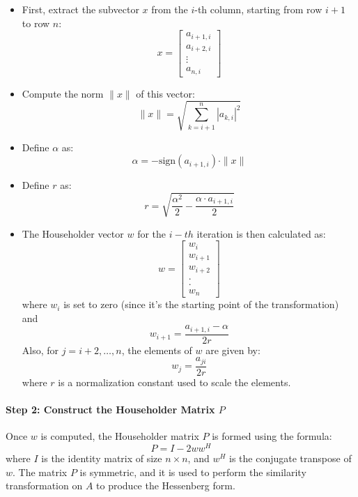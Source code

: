 \documentclass[journal,12pt,onecolumn]{IEEEtran}
\theoremstyle{remark}
\begin{document}
\begin{itemize}
	\item First, extract the subvector \( x \) from the \( i \)-th column, starting from row \( i+1 \) to row \( n \):
	\[
	x = \begin{bmatrix} 
		a_{i+1,i} \\
		a_{i+2,i} \\
		\vdots \\
		a_{n,i}
	\end{bmatrix}
	\]
	\item Compute the norm \( \|x\| \) of this vector:
	\[
	\|x\| = \sqrt{\sum_{k=i+1}^{n} |a_{k,i}|^2}
	\]
	\item Define \(\alpha\) as:
	\[
	\alpha = -\text{sign}(a_{i+1,i}) \cdot \|x\|
	\]
	\item Define \(r \) as:
	\[
	r = \sqrt{\frac{\alpha^{2}}{2} - \frac{\alpha \cdot a_{i+1,i}}{2}}
	\]
	\item The Householder vector \( w \) for the $i-th$ iteration is then calculated as:
	\[
	w = \begin{bmatrix} 
		w_i \\
		w_{i+1} \\
		w_{i+2} \\
		. \\
		. \\
		w_n  
	\end{bmatrix}
	\]
	where $w_i$ is set to zero (since it's the starting point of the transformation) and\\
	\[
	w_{i+1} = \frac{a_{i+1,i} - \alpha}{2r}
	\]
	Also, for \( j = i + 2,\ldots,n \), the elements of \( w \) are given by:
	\[
	w_j = \frac{a_{ji}}{2r}
	\]
	where \( r \) is a normalization constant used to scale the elements. \\
\end{itemize}

\paragraph{Step 2: Construct the Householder Matrix \( P \)}

Once \( w \) is computed, the Householder matrix \( P \) is formed using the formula:
\[
P = I - 2ww^H
\]
where \( I \) is the identity matrix of size \( n \times n \), and \( w^H \) is the conjugate transpose of \( w \). The matrix \( P \) is symmetric, and it is used to perform the similarity transformation on \( A \) to produce the Hessenberg form. \\
\end{document}
